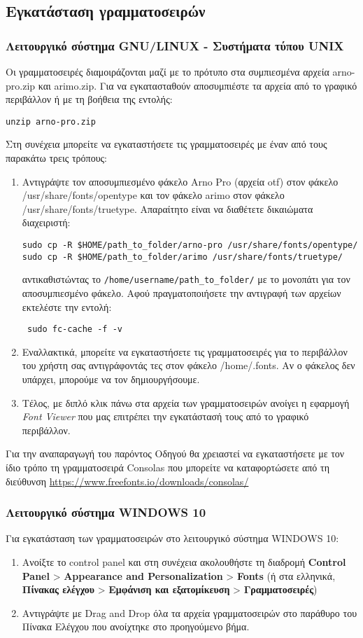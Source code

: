 \begin{refsection}
\subsection{Εγκατάσταση γραμματοσειρών}
\subsubsection{Λειτουργικό σύστημα GNU/LINUX - Συστήματα τύπου UNIX }

Οι γραμματοσειρές διαμοιράζονται μαζί με το πρότυπο στα συμπιεσμένα αρχεία arno-pro.zip και arimo.zip. Για να εγκατασταθούν αποσυμπιέστε τα αρχεία από το γραφικό περιβάλλον ή με τη βοήθεια της εντολής:
\begin{verbatim}
unzip arno-pro.zip
\end{verbatim}
Στη συνέχεια μπορείτε να εγκαταστήσετε τις γραμματοσειρές με έναν από τους παρακάτω τρεις τρόπους:
\begin{enumerate}
\item Αντιγράψτε τον αποσυμπιεσμένο φάκελο Arno Pro (αρχεία otf) στον φάκελο /usr/share/fonts/opentype και τον φάκελο arimo στον φάκελο /usr/share/fonts/truetype. Απαραίτητο είναι να διαθέτετε δικαιώματα διαχειριστή:
\begin{verbatim}
sudo cp -R $HOME/path_to_folder/arno-pro /usr/share/fonts/opentype/
sudo cp -R $HOME/path_to_folder/arimo /usr/share/fonts/truetype/
\end{verbatim}
αντικαθιστώντας το \verb=/home/username/path_to_folder/= με το μονοπάτι για τον αποσυμπιεσμένο φάκελο. Αφού πραγματοποιήσετε την αντιγραφή των αρχείων εκτελέστε την εντολή:
\begin{verbatim} sudo fc-cache -f -v
\end{verbatim}
\item Εναλλακτικά, μπορείτε να εγκαταστήσετε τις γραμματοσειρές για το περιβάλλον του χρήστη σας αντιγράφοντάς τες στον φάκελο /home/.fonts. Αν ο φάκελος δεν υπάρχει, μπορούμε να τον δημιουργήσουμε.
\item Τέλος, με διπλό κλικ πάνω στα αρχεία των γραμματοσειρών ανοίγει η εφαρμογή \emph{Font Viewer} που μας επιτρέπει την εγκατάστασή τους από το γραφικό περιβάλλον.
\end{enumerate}
Για την αναπαραγωγή του παρόντος Οδηγού θα χρειαστεί να εγκαταστήσετε με τον ίδιο τρόπο τη γραμματοσειρά Consolas που μπορείτε να καταφορτώσετε από τη διεύθυνση \url{https://www.freefonts.io/downloads/consolas/}
\subsubsection{Λειτουργικό σύστημα WINDOWS 10}
Για εγκατάσταση των γραμματοσειρών στο λειτουργικό σύστημα WINDOWS 10:
\begin{enumerate}
\item Ανοίξτε το control panel και στη συνέχεια ακολουθήστε τη διαδρομή \textbf{Control Panel} > \textbf{Appearance and Personalization} > \textbf{Fonts} (ή στα ελληνικά, \textbf{Πίνακας ελέγχου} > \textbf{Εμφάνιση και εξατομίκευση} > \textbf{Γραμματοσειρές})
\item Αντιγράψτε με Drag and Drop όλα τα αρχεία γραμματοσειρών στο παράθυρο του Πίνακα Ελέγχου που ανοίχτηκε στο προηγούμενο βήμα.
\end{enumerate}

\end{refsection}
